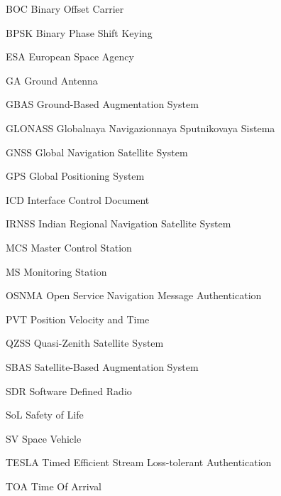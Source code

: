 \begin{abbreviations}

\item[BOC] Binary Offset Carrier
\item[BPSK] Binary Phase Shift Keying
\item[ESA] European Space Agency
\item[GA] Ground Antenna
\item[GBAS] Ground-Based Augmentation System
\item[GLONASS] Globalnaya Navigazionnaya Sputnikovaya Sistema
\item[GNSS] Global Navigation Satellite System
\item[GPS] Global Positioning System
\item[ICD] Interface Control Document
\item[IRNSS] Indian Regional Navigation Satellite System
\item[MCS] Master Control Station
\item[MS] Monitoring Station
\item[OSNMA] Open Service Navigation Message Authentication
\item[PVT] Position Velocity and Time
\item[QZSS] Quasi-Zenith Satellite System
\item[SBAS] Satellite-Based Augmentation System
\item[SDR] Software Defined Radio
\item[SoL] Safety of Life
\item[SV] Space Vehicle
\item[TESLA] Timed Efficient Stream Loss-tolerant Authentication
\item[TOA] Time Of Arrival

\end{abbreviations}
